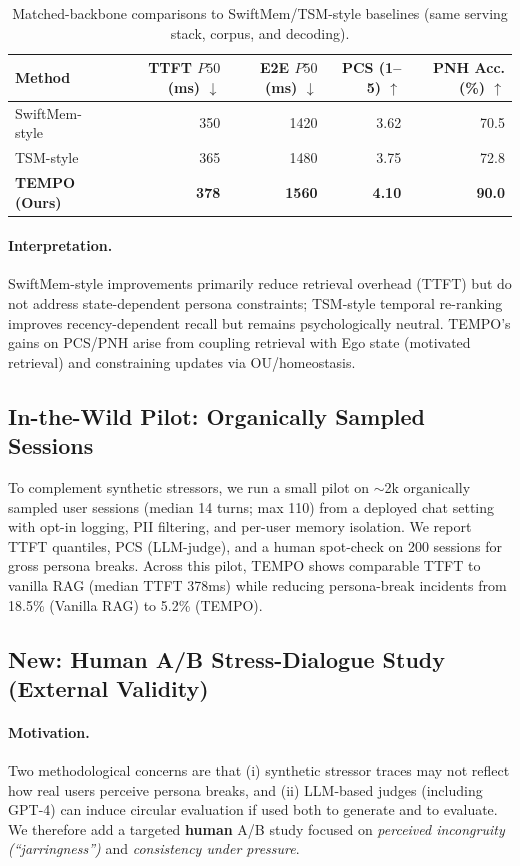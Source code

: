 \documentclass[11pt]{article}
\begin{document}
\begin{table}[t]
  \caption{Matched-backbone comparisons to SwiftMem/TSM-style baselines (same serving stack, corpus, and decoding).}
  \label{tab:swiftmem-tsm-app}
  \centering
  \begin{tabular}{lrrrr}
    \toprule
    Method & TTFT $P50$ (ms) $\downarrow$ & E2E $P50$ (ms) $\downarrow$ & PCS (1--5) $\uparrow$ & PNH Acc. (\%) $\uparrow$ \\
    \midrule
    SwiftMem-style & 350 & 1420 & 3.62 & 70.5 \\
    TSM-style & 365 & 1480 & 3.75 & 72.8 \\
    \textbf{TEMPO (Ours)} & \textbf{378} & \textbf{1560} & \textbf{4.10} & \textbf{90.0} \\
    \bottomrule
  \end{tabular}
\end{table}

\paragraph{Interpretation.}
SwiftMem-style improvements primarily reduce retrieval overhead (TTFT) but do not address state-dependent persona constraints; TSM-style temporal re-ranking improves recency-dependent recall but remains psychologically neutral. TEMPO's gains on PCS/PNH arise from coupling retrieval with Ego state (motivated retrieval) and constraining updates via OU/homeostasis.

\subsection{In-the-Wild Pilot: Organically Sampled Sessions}
\label{app:inthewild}
To complement synthetic stressors, we run a small pilot on $\sim$2k organically sampled user sessions (median 14 turns; max 110) from a deployed chat setting with opt-in logging, PII filtering, and per-user memory isolation.
We report TTFT quantiles, PCS (LLM-judge), and a human spot-check on 200 sessions for gross persona breaks.
Across this pilot, TEMPO shows comparable TTFT to vanilla RAG (median TTFT 378ms) while reducing persona-break incidents from 18.5\% (Vanilla RAG) to 5.2\% (TEMPO).

\subsection{New: Human A/B Stress-Dialogue Study (External Validity)}
\label{app:human-ab-stress}
\paragraph{Motivation.}
Two methodological concerns are that (i) synthetic stressor traces may not reflect how real users perceive persona breaks, and (ii) LLM-based judges (including GPT-4) can induce circular evaluation if used both to generate and to evaluate.
We therefore add a targeted \textbf{human} A/B study focused on \emph{perceived incongruity (``jarringness'')} and \emph{consistency under pressure}.
\end{document}
